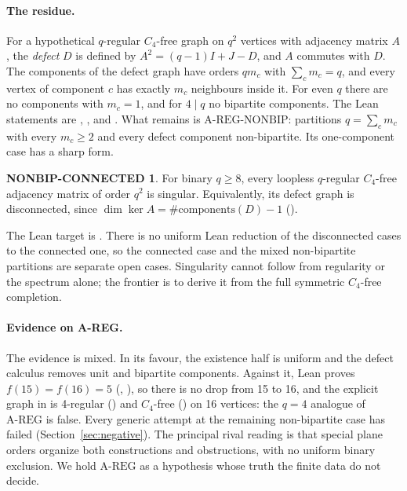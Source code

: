 \documentclass{anvil-paper}
\newcommand{\repocommit}{2029149d7e42b74036ff0e1e82af6d33c2e32748}%
\newcommand{\repocommitshort}{2029149d7e42}
\newcommand{\repobase}{https://github.com/rjwalters/lean-genius/blob/\repocommit}
\newcommand{\repofile}[2]{\href{\repobase/#1}{\lean{#2}}}
\newcommand{\AREG}{\mathrm{A\text{-}REG}}
\newcommand{\NONBIP}{\mathrm{A\text{-}REG\text{-}NONBIP}}
\theoremstyle{definition}
\newtheorem*{nonbipconn}{NONBIP-CONNECTED}
\begin{document}
\paragraph{The residue.} For a hypothetical $q$-regular $C_4$-free graph on $q^2$ vertices with adjacency matrix $A$, the \emph{defect} $D$ is defined by $A^2=(q-1)I+J-D$, and $A$ commutes with $D$. The components of the defect graph have orders $qm_c$ with $\sum_c m_c=q$, and every vertex of component $c$ has exactly $m_c$ neighbours inside it. For even $q$ there are no components with $m_c=1$, and for $4\mid q$ no bipartite components. The Lean statements are , ,  and . What remains is $\NONBIP$: partitions $q=\sum_c m_c$ with every $m_c\ge 2$ and every defect component non-bipartite. Its one-component case has a sharp form.

\begin{nonbipconn}
For binary $q\ge 8$, every loopless $q$-regular $C_4$-free adjacency matrix of order $q^2$ is singular. Equivalently, its defect graph is disconnected, since $\dim\ker A=\#\mathrm{components}(D)-1$ ().
\end{nonbipconn}

\noindent The Lean target is . There is no uniform Lean reduction of the disconnected cases to the connected one, so the connected case and the mixed non-bipartite partitions are separate open cases. Singularity cannot follow from regularity or the spectrum alone; the frontier is to derive it from the full symmetric $C_4$-free completion.

\paragraph{Evidence on A-REG.} The evidence is mixed. In its favour, the existence half is uniform and the defect calculus removes unit and bipartite components. Against it, Lean proves $f(15)=f(16)=5$ (, ), so there is no drop from 15 to 16, and the explicit graph  in \repofile{proofs/Proofs/Erdos85Problem.lean}{Erdos85Problem.lean} is 4-regular () and $C_4$-free () on 16 vertices: the $q=4$ analogue of $\AREG$ is false. Every generic attempt at the remaining non-bipartite case has failed (Section~\ref{sec:negative}). The principal rival reading is that special plane orders organize both constructions and obstructions, with no uniform binary exclusion. We hold $\AREG$ as a hypothesis whose truth the finite data do not decide.
\end{document}
